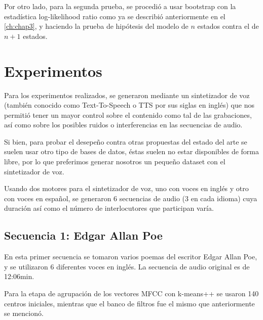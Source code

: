 Por otro lado, para la segunda prueba, se procedió a usar bootstrap con la estadística log-likelihood ratio como ya se describió anteriormente en el \autoref{ch:chap3}, y haciendo la prueba de hipótesis del modelo de $n$ estados contra el de $n+1$ estados.

\section{Experimentos} %
\label{sec:experimentos}

Para los experimentos realizados, se generaron mediante un sintetizador de voz (también conocido como Text-To-Speech o TTS por sus siglas en inglés) que nos permitió tener un mayor control sobre el contenido como tal de las grabaciones, así como sobre los posibles ruidos o interferencias en las secuencias de audio.

Si bien, para probar el desepeño contra otras propuestas del estado del arte se suelen usar otro tipo de bases de datos, éstas suelen no estar disponibles de forma libre, por lo que preferimos generar nosotros un pequeño dataset con el sintetizador de voz.

Usando dos motores para el sintetizador de voz, uno con voces en inglés y otro con voces en español, se generaron 6 secuencias de audio (3 en cada idioma) cuya duración así como el número de interlocutores que participan varía.

\subsection{Secuencia 1: Edgar Allan Poe} %
\label{ssub:calderon}

En esta primer secuencia se tomaron varios poemas del escritor Edgar Allan Poe, y se utilizaron 6 diferentes voces en inglés. La secuencia de audio original es de 12:06min.

Para la etapa de agrupación de los vectores MFCC con k-means++ se usaron 140 centros iniciales, mientras que el banco de filtros fue el mismo que anteriormente se mencionó.

